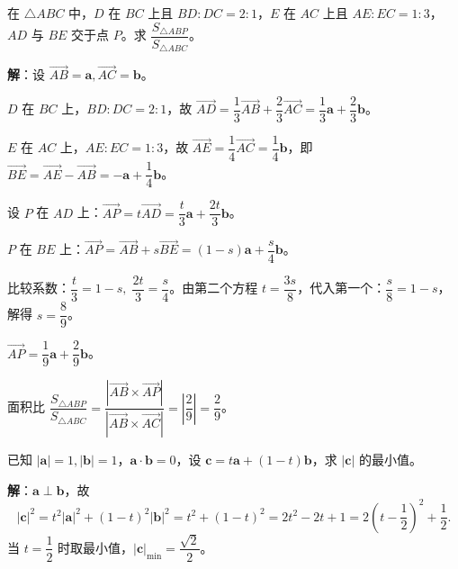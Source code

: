 \documentclass[12pt, a4paper]{ctexart}
\begin{document}
\vspace{6pt}

\begin{examplebox}[【例题9】向量分解与面积比]
在 $\triangle ABC$ 中，$D$ 在 $BC$ 上且 $BD:DC=2:1$，$E$ 在 $AC$ 上且 $AE:EC=1:3$，$AD$ 与 $BE$ 交于点 $P$。求 $\dfrac{S_{\triangle ABP}}{S_{\triangle ABC}}$。
\end{examplebox}

\noindent\textbf{解}：设 $\overrightarrow{AB}=\boldsymbol{a},\overrightarrow{AC}=\boldsymbol{b}$。

$D$ 在 $BC$ 上，$BD:DC=2:1$，故 $\overrightarrow{AD}=\dfrac{1}{3}\overrightarrow{AB}+\dfrac{2}{3}\overrightarrow{AC}=\dfrac{1}{3}\boldsymbol{a}+\dfrac{2}{3}\boldsymbol{b}$。

$E$ 在 $AC$ 上，$AE:EC=1:3$，故 $\overrightarrow{AE}=\dfrac{1}{4}\overrightarrow{AC}=\dfrac{1}{4}\boldsymbol{b}$，即 $\overrightarrow{BE}=\overrightarrow{AE}-\overrightarrow{AB}=-\boldsymbol{a}+\dfrac{1}{4}\boldsymbol{b}$。

设 $P$ 在 $AD$ 上：$\overrightarrow{AP}=t\overrightarrow{AD}=\dfrac{t}{3}\boldsymbol{a}+\dfrac{2t}{3}\boldsymbol{b}$。

$P$ 在 $BE$ 上：$\overrightarrow{AP}=\overrightarrow{AB}+s\overrightarrow{BE}=(1-s)\boldsymbol{a}+\dfrac{s}{4}\boldsymbol{b}$。

比较系数：$\dfrac{t}{3}=1-s,\;\dfrac{2t}{3}=\dfrac{s}{4}$。由第二个方程 $t=\dfrac{3s}{8}$，代入第一个：$\dfrac{s}{8}=1-s$，解得 $s=\dfrac{8}{9}$。

$\overrightarrow{AP}=\dfrac{1}{9}\boldsymbol{a}+\dfrac{2}{9}\boldsymbol{b}$。

面积比 $\dfrac{S_{\triangle ABP}}{S_{\triangle ABC}}=\dfrac{|\overrightarrow{AB}\times\overrightarrow{AP}|}{|\overrightarrow{AB}\times\overrightarrow{AC}|}=\left|\dfrac{2}{9}\right|=\dfrac{2}{9}$。

\vspace{6pt}

\begin{examplebox}[【例题10】向量与函数综合]
已知 $|\boldsymbol{a}|=1,|\boldsymbol{b}|=1$，$\boldsymbol{a}\cdot\boldsymbol{b}=0$，设 $\boldsymbol{c}=t\boldsymbol{a}+(1-t)\boldsymbol{b}$，求 $|\boldsymbol{c}|$ 的最小值。
\end{examplebox}

\noindent\textbf{解}：$\boldsymbol{a}\perp\boldsymbol{b}$，故
\[
  |\boldsymbol{c}|^2=t^2|\boldsymbol{a}|^2+(1-t)^2|\boldsymbol{b}|^2=t^2+(1-t)^2=2t^2-2t+1=2\!\left(t-\frac{1}{2}\right)^2+\frac{1}{2}.
\]
当 $t=\dfrac{1}{2}$ 时取最小值，$|\boldsymbol{c}|_{\min}=\dfrac{\sqrt{2}}{2}$。
\end{document}
